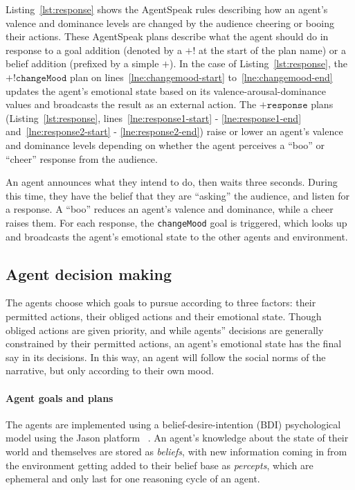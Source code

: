 \documentclass[11pt]{report}
\begin{document}
Listing~\ref{lst:response} shows the AgentSpeak rules describing how an agent's
valence and dominance levels are changed by the audience cheering or booing
their actions. These AgentSpeak plans describe what the agent should do in
response to a goal addition (denoted by a $\texttt{+!}$ at the start of the plan
name) or a belief addition (prefixed by a simple $\texttt{+}$). In the case of
Listing~\ref{lst:response}, the $\texttt{+!changeMood}$ plan on
lines~\ref{lne:changemood-start} to~\ref{lne:changemood-end} updates the agent's
emotional state based on its valence-arousal-dominance values and broadcasts the
result as an external action. The $\texttt{+response}$ plans
(Listing~\ref{lst:response}, lines~\ref{lne:response1-start} - \ref{lne:response1-end}
and~\ref{lne:response2-start} - \ref{lne:response2-end}) raise or lower an agent's valence and dominance levels depending on whether the agent perceives a ``boo'' or ``cheer'' response from the audience.

An agent announces what they intend to do, then waits three seconds. During this time, they have the belief that they are ``asking'' the audience, and listen for a response. A ``boo'' reduces an agent's valence and dominance, while a cheer raises them. For each response, the \texttt{changeMood} goal is triggered, which looks up and broadcasts the agent's emotional state to the other agents and environment.

\subsection{Agent decision making} \label{sec:decisions}
The agents choose which goals to pursue according to three factors: their permitted actions, their obliged actions and their emotional state. Though obliged actions are given priority, and while agents'' decisions are generally constrained by their permitted actions, an agent's emotional state has the final say in its decisions. In this way, an agent will follow the social norms of the narrative, but only according to their own mood.

\paragraph{Agent goals and plans}
The agents are implemented using a belief-desire-intention (BDI) psychological model using the Jason platform ~\citep{bordini2007programming}. An agent's knowledge about the state of their world and themselves are stored as \emph{beliefs}, with new information coming in from the environment getting added to their belief base as \emph{percepts}, which are ephemeral and only last for one reasoning cycle of an agent.
\end{document}
